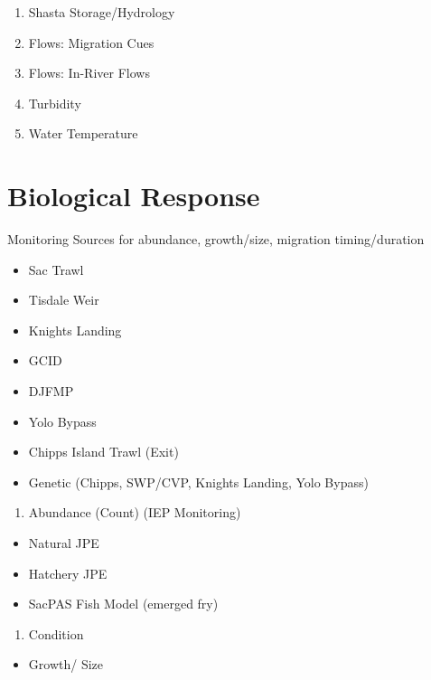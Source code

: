 \documentclass[
]{book}
\providecommand{\tightlist}{%
  \setlength{\itemsep}{0pt}\setlength{\parskip}{0pt}}
\theoremstyle{definition}
\theoremstyle{definition}
\theoremstyle{definition}
\theoremstyle{definition}
\theoremstyle{remark}
\begin{document}
\begin{enumerate}
\def\labelenumi{\arabic{enumi}.}
\item
  Shasta Storage/Hydrology
\item
  Flows: Migration Cues
\item
  Flows: In-River Flows
\item
  Turbidity
\item
  Water Temperature
\end{enumerate}

\hypertarget{biological-response-3}{%
\section{Biological Response}\label{biological-response-3}}

Monitoring Sources for abundance, growth/size, migration timing/duration

\begin{itemize}
\tightlist
\item
  Sac Trawl
\item
  Tisdale Weir
\item
  Knights Landing
\item
  GCID
\item
  DJFMP
\item
  Yolo Bypass
\item
  Chipps Island Trawl (Exit)
\item
  Genetic (Chipps, SWP/CVP, Knights Landing, Yolo Bypass)
\end{itemize}

\begin{enumerate}
\def\labelenumi{\arabic{enumi}.}
\tightlist
\item
  Abundance (Count) (IEP Monitoring)
\end{enumerate}

\begin{itemize}
\tightlist
\item
  Natural JPE
\item
  Hatchery JPE
\item
  SacPAS Fish Model (emerged fry)
\end{itemize}

\begin{enumerate}
\def\labelenumi{\arabic{enumi}.}
\setcounter{enumi}{1}
\tightlist
\item
  Condition
\end{enumerate}

\begin{itemize}
\tightlist
\item
  Growth/ Size
\end{itemize}
\end{document}
